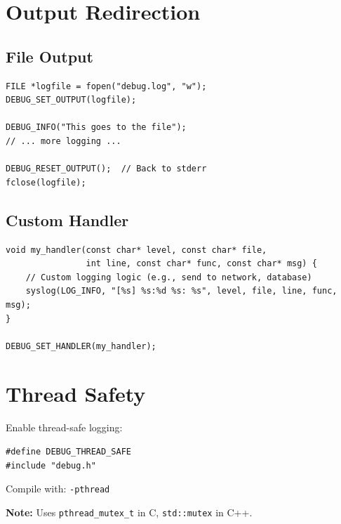 \documentclass[11pt,a4paper]{article}
\begin{document}
\section{Output Redirection}

\subsection{File Output}

\begin{lstlisting}
FILE *logfile = fopen("debug.log", "w");
DEBUG_SET_OUTPUT(logfile);

DEBUG_INFO("This goes to the file");
// ... more logging ...

DEBUG_RESET_OUTPUT();  // Back to stderr
fclose(logfile);
\end{lstlisting}

\subsection{Custom Handler}

\begin{lstlisting}
void my_handler(const char* level, const char* file,
                int line, const char* func, const char* msg) {
    // Custom logging logic (e.g., send to network, database)
    syslog(LOG_INFO, "[%s] %s:%d %s: %s", level, file, line, func, msg);
}

DEBUG_SET_HANDLER(my_handler);
\end{lstlisting}

\section{Thread Safety}

Enable thread-safe logging:

\begin{lstlisting}
#define DEBUG_THREAD_SAFE
#include "debug.h"
\end{lstlisting}

Compile with: \texttt{-pthread}

\textbf{Note:} Uses \texttt{pthread\_mutex\_t} in C, \texttt{std::mutex} in C++.
\end{document}

